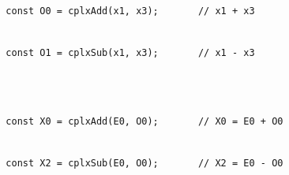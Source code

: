 \documentclass[
]{article}
\newcommand{\passthrough}[1]{#1}
\begin{document}
\passthrough{\lstinline!  !}\passthrough{\lstinline!const!}\passthrough{\lstinline! !}\passthrough{\lstinline!O!}\passthrough{\lstinline!0!}\passthrough{\lstinline! !}\passthrough{\lstinline!=!}\passthrough{\lstinline! !}\passthrough{\lstinline!cplxAdd!}\passthrough{\lstinline!(!}\passthrough{\lstinline!x!}\passthrough{\lstinline!1,!}\passthrough{\lstinline! !}\passthrough{\lstinline!x!}\passthrough{\lstinline!3);!}\passthrough{\lstinline!       !}\passthrough{\lstinline!//!}\passthrough{\lstinline! !}\passthrough{\lstinline!x!}\passthrough{\lstinline!1!}\passthrough{\lstinline! !}\passthrough{\lstinline!+!}\passthrough{\lstinline! !}\passthrough{\lstinline!x!}\passthrough{\lstinline!3!}\strut \\
\passthrough{\lstinline!  !}\passthrough{\lstinline!const!}\passthrough{\lstinline! !}\passthrough{\lstinline!O!}\passthrough{\lstinline!1!}\passthrough{\lstinline! !}\passthrough{\lstinline!=!}\passthrough{\lstinline! !}\passthrough{\lstinline!cplxSub!}\passthrough{\lstinline!(!}\passthrough{\lstinline!x!}\passthrough{\lstinline!1,!}\passthrough{\lstinline! !}\passthrough{\lstinline!x!}\passthrough{\lstinline!3);!}\passthrough{\lstinline!       !}\passthrough{\lstinline!//!}\passthrough{\lstinline! !}\passthrough{\lstinline!x!}\passthrough{\lstinline!1!}\passthrough{\lstinline! !}\passthrough{\lstinline!-!}\passthrough{\lstinline! !}\passthrough{\lstinline!x!}\passthrough{\lstinline!3!}\strut \\
\strut \\
\passthrough{\lstinline!  !}\passthrough{\lstinline!const!}\passthrough{\lstinline! !}\passthrough{\lstinline!X!}\passthrough{\lstinline!0!}\passthrough{\lstinline! !}\passthrough{\lstinline!=!}\passthrough{\lstinline! !}\passthrough{\lstinline!cplxAdd!}\passthrough{\lstinline!(!}\passthrough{\lstinline!E!}\passthrough{\lstinline!0,!}\passthrough{\lstinline! !}\passthrough{\lstinline!O!}\passthrough{\lstinline!0);!}\passthrough{\lstinline!       !}\passthrough{\lstinline!//!}\passthrough{\lstinline! !}\passthrough{\lstinline!X!}\passthrough{\lstinline!0!}\passthrough{\lstinline! !}\passthrough{\lstinline!=!}\passthrough{\lstinline! !}\passthrough{\lstinline!E!}\passthrough{\lstinline!0!}\passthrough{\lstinline! !}\passthrough{\lstinline!+!}\passthrough{\lstinline! !}\passthrough{\lstinline!O!}\passthrough{\lstinline!0!}\strut \\
\passthrough{\lstinline!  !}\passthrough{\lstinline!const!}\passthrough{\lstinline! !}\passthrough{\lstinline!X!}\passthrough{\lstinline!2!}\passthrough{\lstinline! !}\passthrough{\lstinline!=!}\passthrough{\lstinline! !}\passthrough{\lstinline!cplxSub!}\passthrough{\lstinline!(!}\passthrough{\lstinline!E!}\passthrough{\lstinline!0,!}\passthrough{\lstinline! !}\passthrough{\lstinline!O!}\passthrough{\lstinline!0);!}\passthrough{\lstinline!       !}\passthrough{\lstinline!//!}\passthrough{\lstinline! !}\passthrough{\lstinline!X!}\passthrough{\lstinline!2!}\passthrough{\lstinline! !}\passthrough{\lstinline!=!}\passthrough{\lstinline! !}\passthrough{\lstinline!E!}\passthrough{\lstinline!0!}\passthrough{\lstinline! !}\passthrough{\lstinline!-!}\passthrough{\lstinline! !}\passthrough{\lstinline!O!}\passthrough{\lstinline!0!}\strut \\
\end{document}
